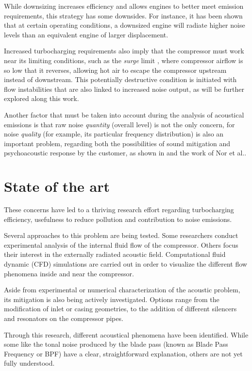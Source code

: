 While downsizing increases efficiency and allows engines to better meet emission requirements, this strategy has some downsides. For instance, it has been shown \cite{stoffels2003nvh} that at certain operating conditions, a downsized engine will radiate higher noise levels than an equivalent engine of larger displacement.

Increased turbocharging requirements also imply that the compressor must work near its limiting conditions, such as the \emph{surge} limit \cite{teng2009investigation}, where compressor airflow is so low that it reverses, allowing hot air to escape the compressor upstream instead of downstream. This potentially destructive condition is initiated with flow instabilities that are also linked to increased noise output, as will be further explored along this work.

Another factor that must be taken into account during the analysis of acoustical emissions is that raw noise \emph{quantity} (overall level) is not the only concern, for noise \emph{quality} (for example, its particular frequency distribution) is also an important problem, regarding both the possibilities of sound mitigation and psychoacoustic response by the customer, as shown in \cite{brizon2012combining} and the work of Nor et al.\cite{nor2008index}.

\section{State of the art}

These concerns have led to a thriving research effort regarding turbocharging efficiency, usefulness to reduce pollution and contribution to noise emissions.

Several approaches to this problem are being tested. Some researchers conduct experimental analysis of the internal fluid flow of the compressor. Others focus their interest in the externally radiated acoustic field. Computational fluid dynamic (CFD) simulations are carried out in order to visualize the different flow phenomena inside and near the compressor.

Aside from experimental or numerical characterization of the acoustic problem, its mitigation is also being actively investigated. Options range from the modification of inlet or casing geometries, to the addition of different silencers and resonators on the compressor pipes.

Through this research, different acoustical phenomena have been identified. While some like the tonal noise produced by the blade pass (known as Blade Pass Frequency or BPF) have a clear, straightforward explanation, others are not yet fully understood.

